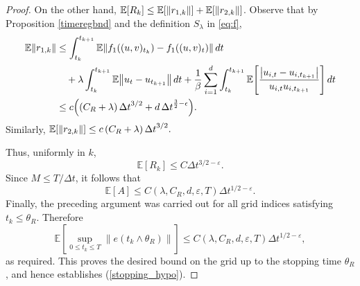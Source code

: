 \documentclass[11pt, twoside]{report}
\begin{document}
\begin{proof}


 

  
 On the other hand, $ \mathbb{E}[R_k] \leq \mathbb{E}[\left\lVert r_{1,k}\right\rVert] + \mathbb{E}[\left\lVert r_{2,k}\right\rVert]$.
 Observe that by Proposition \ref{timeregbnd} and the definition $S_\lambda$ in \eqref{eq:f},
\begin{align*}
   \EE \norm{r_{1,k}}
   &\leq \int_{t_k}^{t_{k+1}} \EE\norm{f_1((u,v)_{t_k}) - f_1((u,v)_t)} \,dt \\
    &\quad+ \lambda \int_{t_k}^{t_{k+1}} \EE \norm{u_t - u_{t_{k+1}}}\, dt
    +\frac{1}{\beta} \sum_{i=1}^d  \int_{t_k}^{t_{k+1}}
    \EE\bp{\frac{\abs{u_{i,t}- u_{i,t_{k+1}}}}{ u_{i,t} u_{i,t_{k+1}}}}\, dt\\
    &\leq c\pa{ (C_R+\lambda)\,\deltat^{3/2} + d\,\deltat^{\frac32 -\epsilon}}.
\end{align*} 
 Similarly,
$
\mathbb{E}[\left\lVert r_{2,k}\right\rVert] \leq c\, (C_R+\lambda) \,{\Delta t}^{3/2}.
$



Thus, uniformly in \(k\),
\[
\mathbb E[R_k]\leq C\Delta t^{3/2-\varepsilon}.
\]
Since \(M\le T/\Delta t\), it follows that
\[\mathbb E[A]
\le
C(\lambda,C_R,d,\varepsilon,T)
\Delta t^{1/2-\varepsilon}.
\]
Finally, the preceding argument was carried out for all grid indices
satisfying \(t_k\le \theta_R\). Therefore
\[
\mathbb E\left[
\sup_{0\le t_k\le T}
\|e(t_k\wedge\theta_R)\|
\right]
\le
C(\lambda,C_R,d,\varepsilon,T)\Delta t^{1/2-\varepsilon},
\]
as required. This proves the desired bound on the grid up to the stopping time \(\theta_R\), and hence
establishes (\ref{stopping_hypo}).




\end{proof}
\end{document}
